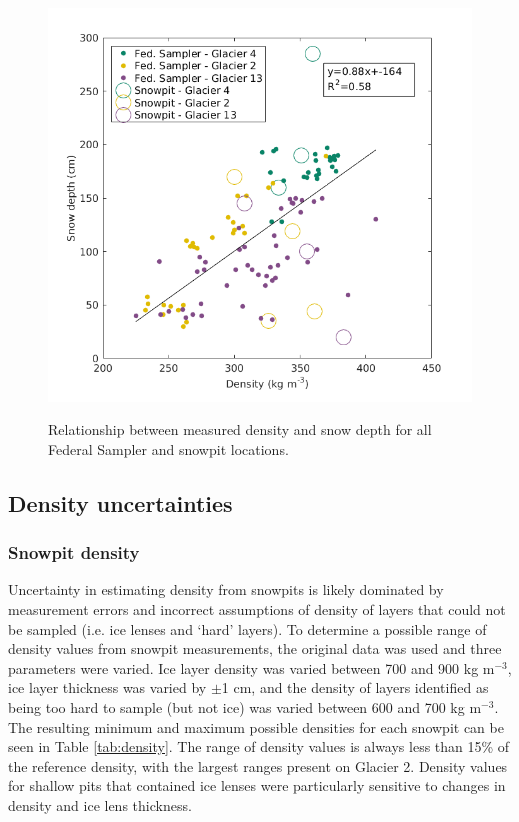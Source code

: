 \documentclass[12pt]{article}
\begin{document}
\begin{figure}[p]
	\includegraphics[width = \textwidth]{DepthDensity_SWEonly.png}\\
	\caption{Relationship between measured density and snow depth for all Federal Sampler and snowpit locations.}
	\label{fig:all_depth}
\end{figure}

\subsection{Density uncertainties}

\subsubsection{Snowpit density}

Uncertainty in estimating density from snowpits is likely dominated by measurement errors and incorrect assumptions of density of layers that could not be sampled (i.e. ice lenses and `hard' layers). To determine a possible range of density values from snowpit measurements, the original data was used and three parameters were varied. Ice layer density was varied between 700 and 900 kg m$^{-3}$, ice layer thickness was varied by $\pm$1 cm, and the density of layers identified as being too hard to sample (but not ice) was varied between 600 and 700 kg m$^{-3}$. The resulting minimum and maximum possible densities for each snowpit can be seen in Table \ref{tab:density}. The range of density values is always less than 15\% of the reference density, with the largest ranges present on Glacier 2. Density values for shallow pits that contained ice lenses were particularly sensitive to changes in density and ice lens thickness. 
\end{document}

